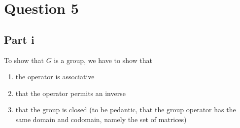 \documentclass[letterpaper]{article}
\begin{document}
\section{Question 5}
\label{sec:Question5}

\subsection{Part i}
\label{sub:5Parti}

To show that $ G $ is a group, we have to show that
\begin{enumerate}
    \item the operator is associative
    \item that the operator permits an inverse
    \item that the group is closed (to be pedantic, that the group operator has the same domain and codomain, namely the set of matrices)
\end{enumerate}
\end{document}
